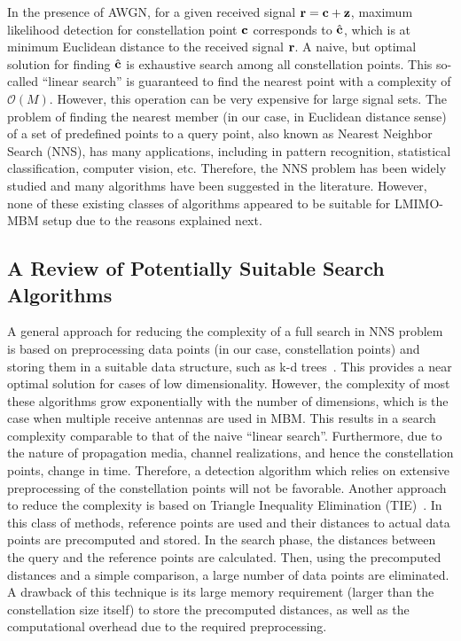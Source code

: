 In the presence of AWGN, for a given received signal $\mathbf{r} = \mathbf{c} + \mathbf{z} $, maximum likelihood detection for constellation point $ \mathbf{c}$ corresponds to $\hat{\mathbf{ c } }$, which is at minimum Euclidean distance to the received signal $\mathbf{r}$. A naive, but optimal solution for finding $\hat {\mathbf{c}}$ is exhaustive search among all constellation points. This so-called ``linear search'' is guaranteed to find the nearest point with a complexity of $\mathcal{O}(M)$. However, this operation can be very expensive for large signal sets. The problem of finding the nearest member (in our case, in Euclidean distance sense) of a set of predefined points to a query point, also known as Nearest Neighbor Search (NNS), has many applications, including in pattern recognition, statistical classification, computer vision, etc. Therefore, the NNS problem has been widely studied and many algorithms have been suggested in the literature. However, none of these  existing classes of algorithms appeared to be suitable for LMIMO-MBM setup due to the reasons explained next.

\subsection {A Review of Potentially Suitable Search Algorithms}
A general approach for reducing the complexity of a full search in NNS problem is based on preprocessing data points (in our case, constellation points) and storing them in a suitable data structure, such as k-d trees~\cite{kdtree1}. This provides a near optimal solution for cases of low dimensionality. However, the complexity of most these algorithms grow exponentially with the number of dimensions, which is the case when multiple receive antennas are used in MBM. This results in a search complexity comparable to that of the naive ``linear search''.
Furthermore, due to the nature of propagation media, channel realizations, and hence the constellation points, change in time. Therefore, a detection algorithm which relies on extensive preprocessing of the constellation points will not be favorable. Another approach to reduce the complexity is based on Triangle Inequality Elimination (TIE)~\cite{TIE1, TIE2, TIE3, TIE4}. In this class of methods, reference points are used and their distances to actual data points are precomputed and stored. In the search phase, the distances between the query and the reference points are calculated. Then, using the precomputed distances and a simple comparison, a large number of data points are eliminated. A drawback of this technique is its large memory requirement (larger than the constellation size itself) to store the precomputed distances, as well as the computational overhead due to the required preprocessing.

